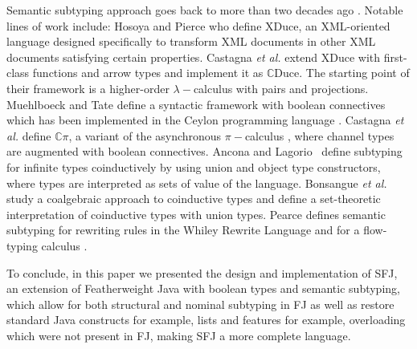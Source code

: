 \documentclass[runningheads]{llncs}
\begin{document}
Semantic subtyping approach goes back to more than two decades ago \cite{Aiken,Damm}.
Notable lines of work include:
Hosoya and Pierce \cite{XML1,XML2,XML3} who define XDuce, an XML-oriented language designed specifically to transform XML documents in other XML documents satisfying certain properties.
Castagna \emph{et al.} \cite{Castagna2005,Cas05,FCB08} extend XDuce with first-class functions and arrow types and implement it as $\mathbb{C}$Duce. The starting point of their framework is a higher-order $\lambda-$calculus with pairs and projections.
Muehlboeck and Tate \cite{Muehlboeck2018} define a syntactic framework with boolean connectives which has been implemented in the Ceylon programming language \cite{Ceylon2016}.
Castagna \emph{et al.} \cite{Cpi} define $\mathbb{C}\pi$, a variant of the asynchronous $\pi-$calculus \cite{sangiorgi}, where channel types are augmented with boolean connectives.
Ancona and Lagorio~\cite{AL10} define subtyping for infinite types coinductively by using union and object type constructors, where types are interpreted as sets of value of the language.
Bonsangue \emph{et al.}~\cite{BRABR14} study a coalgebraic approach to coinductive types and define a set-theoretic interpretation of coinductive types with union types.
Pearce \cite{Pearce19} defines semantic subtyping for rewriting rules in the Whiley Rewrite Language and for a flow-typing calculus  \cite{Pearce13}.

To conclude, in this paper we presented the design and implementation of SFJ, an extension of Featherweight Java with boolean types and semantic subtyping, which allow for both structural and nominal subtyping in FJ as well as restore standard Java constructs for example, lists and features for example, overloading which were not present in FJ, making SFJ a more complete language.

\newpage


\end{document}
